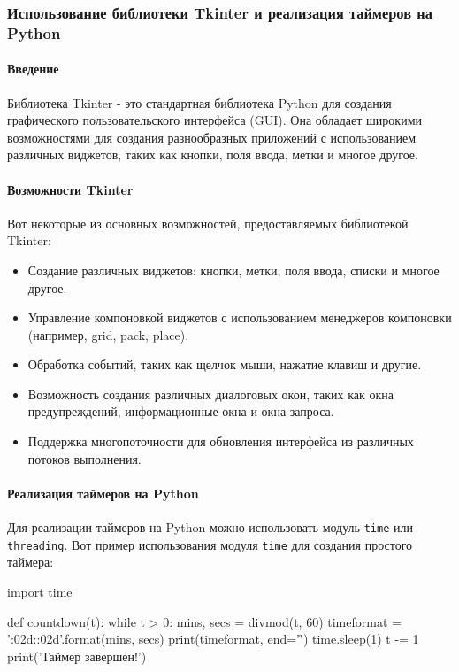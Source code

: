 \subsubsection{Использование библиотеки Tkinter и реализация таймеров на Python}
	
\paragraph{Введение}
Библиотека Tkinter - это стандартная библиотека Python для создания графического пользовательского интерфейса (GUI). Она обладает широкими возможностями для создания разнообразных приложений с использованием различных виджетов, таких как кнопки, поля ввода, метки и многое другое.
	
\paragraph{Возможности Tkinter}
Вот некоторые из основных возможностей, предоставляемых библиотекой Tkinter:
	
\begin{itemize}
	\item Создание различных виджетов: кнопки, метки, поля ввода, списки и многое другое.
	\item Управление компоновкой виджетов с использованием менеджеров компоновки (например, grid, pack, place).
	\item Обработка событий, таких как щелчок мыши, нажатие клавиш и другие.
	\item Возможность создания различных диалоговых окон, таких как окна предупреждений, информационные окна и окна запроса.
	\item Поддержка многопоточности для обновления интерфейса из различных потоков выполнения.
\end{itemize}
	
\paragraph{Реализация таймеров на Python}
Для реализации таймеров на Python можно использовать модуль \texttt{time} или \texttt{threading}. Вот пример использования модуля \texttt{time} для создания простого таймера:
	
	import time
	
	def countdown(t):
	while t > 0:
	mins, secs = divmod(t, 60)
	timeformat = '{:02d}:{:02d}'.format(mins, secs)
	print(timeformat, end='\r')
	time.sleep(1)
	t -= 1
	print('Таймер завершен!')
	
